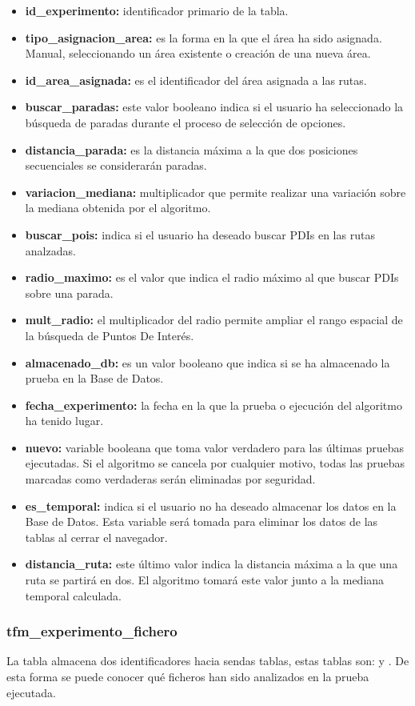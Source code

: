 \begin{itemize}
	\item \textbf{id\_experimento:} identificador primario de la tabla.
	\item \textbf{tipo\_asignacion\_area:} es la forma en la que el área ha sido asignada. Manual, seleccionando un área existente o creación de una nueva área.
	\item \textbf{id\_area\_asignada:} es el identificador del área asignada a las rutas.
	\item \textbf{buscar\_paradas:} este valor booleano indica si el usuario ha seleccionado la búsqueda de paradas durante el proceso de selección de opciones.
	\item \textbf{distancia\_parada:} es la distancia máxima a la que dos posiciones secuenciales se considerarán paradas.
	\item \textbf{variacion\_mediana:} multiplicador que permite realizar una variación sobre la mediana obtenida por el algoritmo.
	\item \textbf{buscar\_pois:} indica si el usuario ha deseado buscar PDIs en las rutas analzadas.
	\item \textbf{radio\_maximo:} es el valor que indica el radio máximo al que buscar PDIs sobre una parada.
	\item \textbf{mult\_radio:} el multiplicador del radio permite ampliar el rango espacial de la búsqueda de Puntos De Interés.
	\item \textbf{almacenado\_db:} es un valor booleano que indica si se ha almacenado la prueba en la Base de Datos.
	\item \textbf{fecha\_experimento:} la fecha en la que la prueba o ejecución del algoritmo ha tenido lugar.
	\item \textbf{nuevo:} variable booleana que toma valor verdadero para las últimas pruebas ejecutadas. Si el algoritmo se cancela por cualquier motivo, todas las pruebas marcadas como verdaderas serán eliminadas por seguridad.
	\item \textbf{es\_temporal:} indica si el usuario no ha deseado almacenar los datos en la Base de Datos. Esta variable será tomada para eliminar los datos de las tablas al cerrar el navegador.
	\item \textbf{distancia\_ruta:} este último valor indica la distancia máxima a la que una ruta se partirá en dos. El algoritmo tomará este valor junto a la mediana temporal calculada.
\end{itemize}

\subsubsection{tfm\_experimento\_fichero}
La tabla  almacena dos identificadores hacia sendas tablas, estas tablas son:  y . De esta forma se puede  conocer qué ficheros han sido analizados en la prueba ejecutada.


